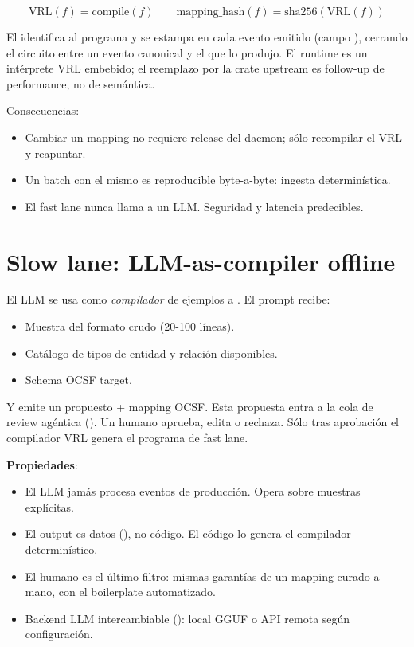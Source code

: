 \begin{equation*}
\text{VRL}(f) = \text{compile}(f) \qquad
\text{mapping\_hash}(f) = \text{sha256}(\text{VRL}(f))
\end{equation*}

El  identifica al programa y se estampa en cada
evento emitido (campo ), cerrando el
circuito entre un evento canonical y el  que lo
produjo. El runtime es un intérprete VRL embebido; el reemplazo por
la crate  upstream es follow-up de performance, no de
semántica.

Consecuencias:

\begin{itemize}
    \item Cambiar un mapping no requiere release del daemon; sólo
    recompilar el VRL y reapuntar.
    \item Un batch con el mismo  es reproducible
    byte-a-byte: ingesta determinística.
    \item El fast lane nunca llama a un LLM. Seguridad y latencia
    predecibles.
\end{itemize}

\section{Slow lane: LLM-as-compiler offline}

El LLM se usa como \emph{compilador} de ejemplos a
. El prompt recibe:

\begin{itemize}
    \item Muestra del formato crudo (20-100 líneas).
    \item Catálogo de tipos de entidad y relación disponibles.
    \item Schema OCSF target.
\end{itemize}

Y emite un  propuesto + mapping OCSF. Esta
propuesta entra a la cola de review agéntica
(). Un humano aprueba, edita o
rechaza. Sólo tras aprobación el compilador VRL genera el programa
de fast lane.

\textbf{Propiedades}:

\begin{itemize}
    \item El LLM jamás procesa eventos de producción. Opera sobre
    muestras explícitas.
    \item El output es datos (), no código. El
    código lo genera el compilador determinístico.
    \item El humano es el último filtro: mismas garantías de un
    mapping curado a mano, con el boilerplate automatizado.
    \item Backend LLM intercambiable
    (): local GGUF o API remota según
    configuración.
\end{itemize}

